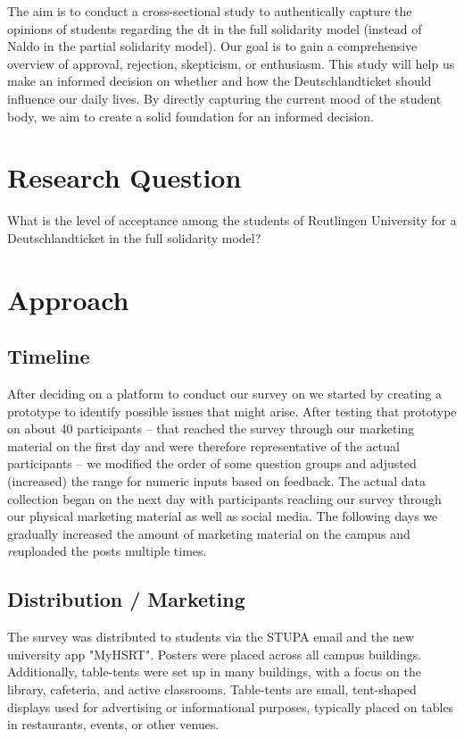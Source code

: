 The aim is to conduct a cross-sectional study to authentically capture the opinions of students regarding the \gls{dt} in the full solidarity model (instead of Naldo in the partial solidarity model). Our goal is to gain a comprehensive overview of approval, rejection, skepticism, or enthusiasm. This study will help us make an informed decision on whether and how the Deutschlandticket should influence our daily lives. By directly capturing the current mood of the student body, we aim to create a solid foundation for an informed decision.

\section{Research Question}

What is the level of acceptance among the students of Reutlingen University for a Deutschlandticket in the full solidarity model?

\section{Approach}
\subsection{Timeline}
After deciding on a platform to conduct our survey on we started by creating a prototype to identify possible issues that might arise. After testing that prototype on about 40 participants -- that reached the survey through our marketing material on the first day and were therefore representative of the actual participants -- we modified the order of some question groups and adjusted (increased) the range for numeric inputs based on feedback. The actual data collection began on the next day with participants reaching our survey through our physical marketing material as well as social media. The following days we gradually increased the amount of marketing material on the campus and \textit{re}uploaded the posts multiple times.

\subsection{Distribution / Marketing}

The survey was distributed to students via the STUPA email and the new university app "MyHSRT". Posters were placed across all campus buildings. Additionally, table-tents were set up in many buildings, with a focus on the library, cafeteria, and active classrooms. Table-tents are small, tent-shaped displays used for advertising or informational purposes, typically placed on tables in restaurants, events, or other venues.

